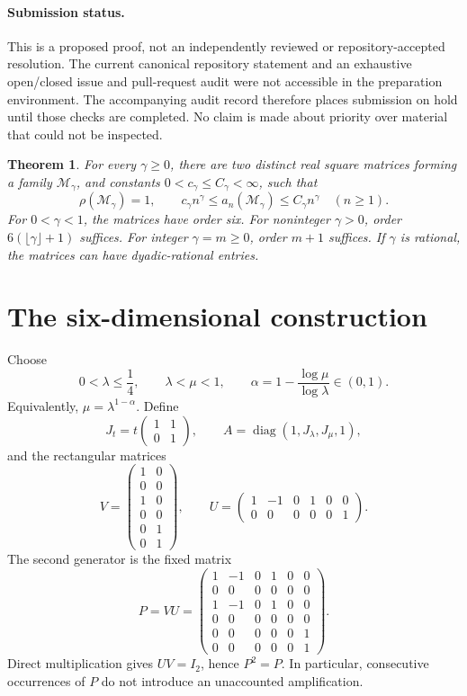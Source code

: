 \documentclass[11pt]{article}
\newtheorem{theorem}{Theorem}
\theoremstyle{remark}\newtheorem{remark}[theorem]{Remark}
\newcommand{\diag}{\operatorname{diag}}
\newcommand{\jsr}{\rho}
\begin{document}
\paragraph{Submission status.}
This is a proposed proof, not an independently reviewed or repository-accepted resolution. The current canonical repository statement and an exhaustive open/closed issue and pull-request audit were not accessible in the preparation environment. The accompanying audit record therefore places submission on hold until those checks are completed. No claim is made about priority over material that could not be inspected.

\begin{theorem}\label{thm:main}
For every $\gamma\geq0$, there are two distinct real square matrices forming a family $\mathcal M_\gamma$, and constants $0<c_\gamma\leq C_\gamma<\infty$, such that
\[
 \jsr(\mathcal M_\gamma)=1,\qquad
 c_\gamma n^\gamma\leq a_n(\mathcal M_\gamma)
                  \leq C_\gamma n^\gamma\quad(n\geq1).
\]
For $0<\gamma<1$, the matrices have order six. For noninteger $\gamma>0$, order $6(\lfloor\gamma\rfloor+1)$ suffices. For integer $\gamma=m\geq0$, order $m+1$ suffices. If $\gamma$ is rational, the matrices can have dyadic-rational entries.
\end{theorem}

\section{The six-dimensional construction}
Choose
\[
 0<\lambda\leq\frac14,\qquad \lambda<\mu<1,\qquad
 \alpha=1-\frac{\log\mu}{\log\lambda}\in(0,1).
\]
Equivalently, $\mu=\lambda^{1-\alpha}$. Define
\[
 J_t=t\begin{pmatrix}1&1\\0&1\end{pmatrix},\qquad
 A=\diag(1,J_\lambda,J_\mu,1),
\]
and the rectangular matrices
\[
 V=\begin{pmatrix}
 1&0\\0&0\\1&0\\0&0\\0&1\\0&1
 \end{pmatrix},\qquad
 U=\begin{pmatrix}
 1&-1&0&1&0&0\\
 0&0&0&0&0&1
 \end{pmatrix}.
\]
The second generator is the fixed matrix
\begin{equation}\label{eq:P}
 P=VU=\begin{pmatrix}
 1&-1&0&1&0&0\\
 0&0&0&0&0&0\\
 1&-1&0&1&0&0\\
 0&0&0&0&0&0\\
 0&0&0&0&0&1\\
 0&0&0&0&0&1
 \end{pmatrix}.
\end{equation}
Direct multiplication gives $UV=I_2$, hence $P^2=P$. In particular, consecutive occurrences of $P$ do not introduce an unaccounted amplification.
\end{document}
